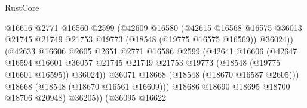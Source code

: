 \begin{lexlean}{RustCore}
\begin{coremodule}
                                          @16616
                                          @2771
                                          @16560
                                          @2599
                                          (@42609
                                            @16580
                                            (@42615
                                              @16568
                                              @16575
                                              @36013
                                              @21745
                                              @21749
                                              @21753
                                              @19773
                                              (@18548 (@19775 @16575 @16569))
                                              @36024))
                                          (@42633
                                            @16606
                                            @2605
                                            @2651
                                            @2771
                                            @16586
                                            @2599
                                            (@42641
                                              @16606
                                              (@42647
                                                @16594
                                                @16601
                                                @36057
                                                @21745
                                                @21749
                                                @21753
                                                @19773
                                                (@18548 (@19775 @16601 @16595))
                                                @36024))
                                            @36071
                                            @18668
                                            (@18548 (@18670 @16587 @2605)))
                                          @18668
                                          (@18548 (@18670 @16561 @16609)))
                                        @18686
                                        @18690
                                        @18695
                                        @18700
                                        @18706
                                        @20948)
                                      @36205))
                                  (@36095
                                    @16622

\end{coremodule}
\end{lexlean}
